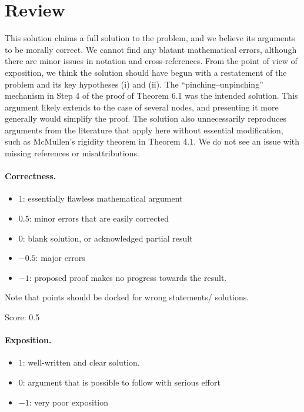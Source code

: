 \documentclass[11pt]{article}
\theoremstyle{remark}
\begin{document}
\maketitle

\section{Review}
This solution claims a full solution to the problem, and we believe its arguments to be morally correct. We cannot find any blatant mathematical errors, although there are minor issues in notation and cross-references.
From the point of view of exposition, we think the solution should have begun with a restatement of the problem and its key hypotheses (i) and (ii). The “pinching–unpinching” mechanism in Step 4 of the proof of Theorem 6.1 was the intended solution. This argument likely extends to the case of several nodes, and presenting it more generally would simplify the proof. The solution also unnecessarily reproduces arguments from the literature that apply here without essential modification, such as McMullen’s rigidity theorem in Theorem 4.1.
We do not see an issue with missing references or misattributions.


\paragraph{Correctness.}
\begin{itemize}
	\item  1: essentially flawless mathematical argument
	\item  0.5: minor errors that are easily corrected
	\item  0: blank solution, or acknowledged partial result
	\item  $-0.5$: major errors
	\item  $-1$: proposed proof makes no progress towards the result.
\end{itemize}
Note that points should be docked for wrong statements/ solutions.

\noindent Score: 0.5

\paragraph{Exposition.}
\begin{itemize}
	\item  1: well-written and clear solution.
	\item  0: argument that is possible to follow with serious effort
	\item  $-1$: very poor exposition
\end{itemize}
\end{document}
